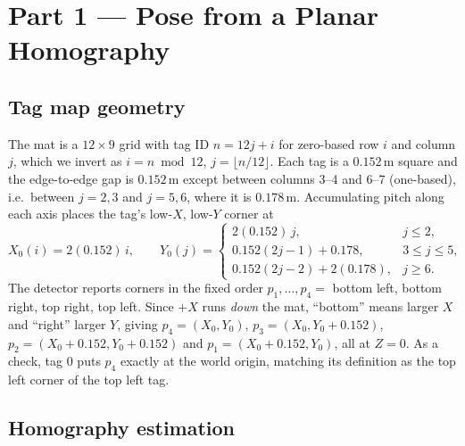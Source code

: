 \documentclass[10pt]{article}
\begin{document}
\section{Part 1 --- Pose from a Planar Homography}

\subsection{Tag map geometry}

The mat is a $12\times9$ grid with tag ID $n = 12j+i$ for zero-based row $i$ and column $j$, which we
invert as $i = n \bmod 12$, $j = \lfloor n/12\rfloor$. Each tag is a $0.152\,$m square and the
edge-to-edge gap is $0.152\,$m except between columns 3--4 and 6--7 (one-based), i.e.\ between
$j=2,3$ and $j=5,6$, where it is $0.178\,$m. Accumulating pitch along each axis places the tag's
low-$X$, low-$Y$ corner at
\begin{equation}
X_0(i) = 2(0.152)\,i, \qquad
Y_0(j) = \begin{cases}
2(0.152)\,j, & j \le 2,\\
0.152(2j-1) + 0.178, & 3 \le j \le 5,\\
0.152(2j-2) + 2(0.178), & j \ge 6 .
\end{cases}
\end{equation}
The detector reports corners in the fixed order $p_1,\dots,p_4 = $ bottom left, bottom right, top
right, top left. Since $+X$ runs \emph{down} the mat, ``bottom'' means larger $X$ and ``right''
larger $Y$, giving $p_4=(X_0,Y_0)$, $p_3=(X_0,Y_0+0.152)$, $p_2=(X_0+0.152,Y_0+0.152)$ and
$p_1=(X_0+0.152,Y_0)$, all at $Z=0$. As a check, tag $0$ puts $p_4$ exactly at the world origin,
matching its definition as the top left corner of the top left tag.

\subsection{Homography estimation}
\end{document}
